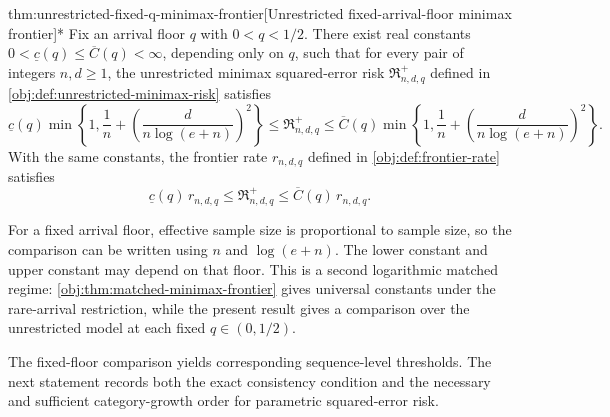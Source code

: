 \documentclass[11pt]{article}
\begin{document}
\begin{theoremv}{thm:unrestricted-fixed-q-minimax-frontier}[Unrestricted fixed-arrival-floor minimax frontier]*
Fix an arrival floor \(q\) with \(0<q<1/2\). There exist real constants \(0<\underline c(q)\le \overline C(q)<\infty\), depending only on \(q\), such that for every pair of integers \(n,d\ge1\), the unrestricted minimax squared-error risk \(\mathfrak R^{+}_{n,d,q}\) defined in \cref{obj:def:unrestricted-minimax-risk} satisfies
\[
\underline c(q)
\min\left\{1,\frac1n+\left(\frac{d}{n\log(e+n)}\right)^2\right\}
\le \mathfrak R^{+}_{n,d,q}
\le \overline C(q)
\min\left\{1,\frac1n+\left(\frac{d}{n\log(e+n)}\right)^2\right\}.
\]
With the same constants, the frontier rate \(r_{n,d,q}\) defined in \cref{obj:def:frontier-rate} satisfies
\[
\underline c(q)\,r_{n,d,q}
\le \mathfrak R^{+}_{n,d,q}
\le \overline C(q)\,r_{n,d,q}.
\]
\end{theoremv}

For a fixed arrival floor, effective sample size is proportional to sample size, so the comparison can be written using \(n\) and \(\log(e+n)\). The lower constant  and upper constant  may depend on that floor. This is a second logarithmic matched regime: \cref{obj:thm:matched-minimax-frontier} gives universal constants under the rare-arrival restriction, while the present result gives a comparison over the unrestricted model at each fixed \(q\in(0,1/2)\).

The fixed-floor comparison yields corresponding sequence-level thresholds. The next statement records both the exact consistency condition and the necessary and sufficient category-growth order for parametric squared-error risk.
\end{document}
